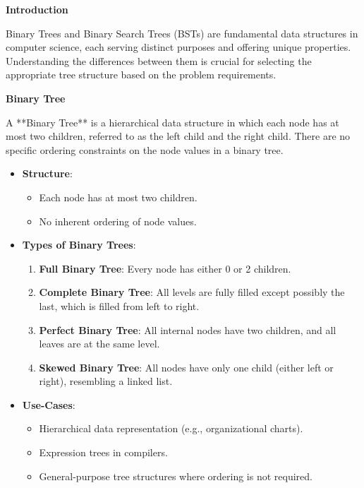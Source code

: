 

\textbf{Introduction}

Binary Trees and Binary Search Trees (BSTs) are fundamental data structures in computer science, each serving distinct purposes and offering unique properties. Understanding the differences between them is crucial for selecting the appropriate tree structure based on the problem requirements.

\textbf{Binary Tree}

A **Binary Tree** is a hierarchical data structure in which each node has at most two children, referred to as the left child and the right child. There are no specific ordering constraints on the node values in a binary tree.

\begin{itemize}
    \item \textbf{Structure}:
    \begin{itemize}
        \item Each node has at most two children.
        \item No inherent ordering of node values.
    \end{itemize}
    
    \item \textbf{Types of Binary Trees}:
    \begin{enumerate}
        \item \textbf{Full Binary Tree}: Every node has either 0 or 2 children.
        \item \textbf{Complete Binary Tree}: All levels are fully filled except possibly the last, which is filled from left to right.
        \item \textbf{Perfect Binary Tree}: All internal nodes have two children, and all leaves are at the same level.
        \item \textbf{Skewed Binary Tree}: All nodes have only one child (either left or right), resembling a linked list.
    \end{enumerate}
    
    \item \textbf{Use-Cases}:
    \begin{itemize}
        \item Hierarchical data representation (e.g., organizational charts).
        \item Expression trees in compilers.
        \item General-purpose tree structures where ordering is not required.
    \end{itemize}
\end{itemize}

